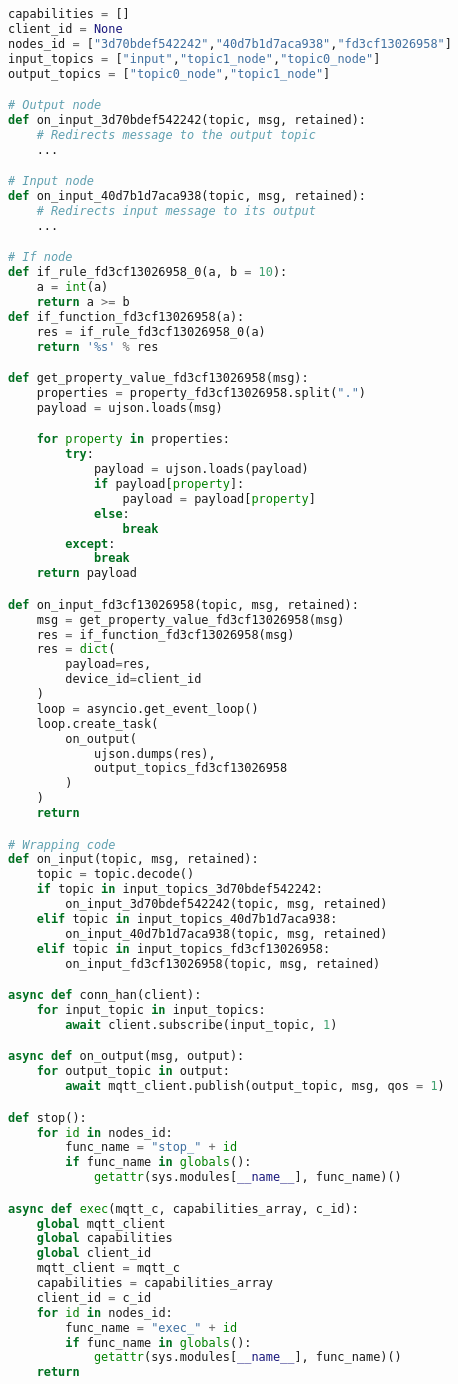 \begin{lstlisting}[language=Python, caption={Example of code generated from the flow presented in Figure \ref{fig:code_generation_flow}.}, captionpos=b, label={lst:code_generation}]
capabilities = []
client_id = None
nodes_id = ["3d70bdef542242","40d7b1d7aca938","fd3cf13026958"]
input_topics = ["input","topic1_node","topic0_node"]
output_topics = ["topic0_node","topic1_node"]

# Output node
def on_input_3d70bdef542242(topic, msg, retained):
    # Redirects message to the output topic
    ...

# Input node
def on_input_40d7b1d7aca938(topic, msg, retained):
    # Redirects input message to its output
    ...

# If node
def if_rule_fd3cf13026958_0(a, b = 10):
    a = int(a)
    return a >= b
def if_function_fd3cf13026958(a):
    res = if_rule_fd3cf13026958_0(a)
    return '%s' % res

def get_property_value_fd3cf13026958(msg):
    properties = property_fd3cf13026958.split(".")
    payload = ujson.loads(msg)

    for property in properties:
        try:
            payload = ujson.loads(payload)
            if payload[property]:
                payload = payload[property]
            else:
                break
        except:
            break
    return payload

def on_input_fd3cf13026958(topic, msg, retained):
    msg = get_property_value_fd3cf13026958(msg)
    res = if_function_fd3cf13026958(msg)
    res = dict(
        payload=res,
        device_id=client_id
    )
    loop = asyncio.get_event_loop()
    loop.create_task(
        on_output(
            ujson.dumps(res),
            output_topics_fd3cf13026958
        )
    )
    return

# Wrapping code
def on_input(topic, msg, retained):
    topic = topic.decode()
    if topic in input_topics_3d70bdef542242:
        on_input_3d70bdef542242(topic, msg, retained)
    elif topic in input_topics_40d7b1d7aca938:
        on_input_40d7b1d7aca938(topic, msg, retained)
    elif topic in input_topics_fd3cf13026958:
        on_input_fd3cf13026958(topic, msg, retained)

async def conn_han(client):
    for input_topic in input_topics:
        await client.subscribe(input_topic, 1)

async def on_output(msg, output):
    for output_topic in output:
        await mqtt_client.publish(output_topic, msg, qos = 1)

def stop():
    for id in nodes_id:
        func_name = "stop_" + id
        if func_name in globals():
            getattr(sys.modules[__name__], func_name)()

async def exec(mqtt_c, capabilities_array, c_id):
    global mqtt_client
    global capabilities
    global client_id
    mqtt_client = mqtt_c
    capabilities = capabilities_array
    client_id = c_id
    for id in nodes_id:
        func_name = "exec_" + id
        if func_name in globals():
            getattr(sys.modules[__name__], func_name)()
    return
\end{lstlisting}

